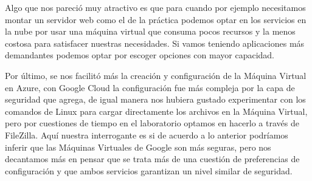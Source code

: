 \documentclass[12pt,a4paper]{article}
\begin{document}
Algo que nos pareció muy atractivo es que para cuando por ejemplo necesitamos montar un servidor web como el de la práctica podemos optar en los servicios en la nube por usar una máquina virtual que consuma pocos recursos y la menos costosa para satisfacer nuestras necesidades. Si vamos teniendo aplicaciones más demandantes podemos optar por escoger opciones con mayor capacidad.

\vspace{1em}

Por último, se nos facilitó más la creación y configuración de la Máquina Virtual en Azure, con Google Cloud la configuración fue más compleja por la capa de seguridad que agrega, de igual manera nos hubiera gustado experimentar con los comandos de Linux para cargar directamente los archivos en la Máquina Virtual, pero por cuestiones de tiempo en el laboratorio optamos en hacerlo a través de FileZilla. Aquí nuestra interrogante es si de acuerdo a lo anterior podríamos inferir que las Máquinas Virtuales de Google son más seguras, pero nos decantamos más en pensar que se trata más de una cuestión de preferencias de configuración y que ambos servicios garantizan un nivel similar de seguridad.
\end{document}
